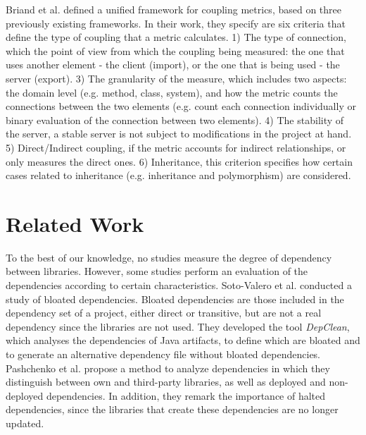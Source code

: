 \documentclass[a4paper]{article}
\begin{document}
Briand et al. \cite{briand1999unified} defined a unified framework for coupling metrics, based on three previously existing frameworks. In their work, they specify are six criteria that define the type of coupling that a metric calculates. 1) The type of connection, which the point of view from which the coupling being measured: the one that uses another element - the client (import), or the one that is being used - the server (export). 3) The granularity of the measure, which includes two aspects: the domain level (e.g. method, class, system), and how the metric counts the connections between the two elements (e.g. count each connection individually or binary evaluation of the connection between two elements). 4) The stability of the server, a stable server is not subject to modifications in the project at hand. 5) Direct/Indirect coupling, if the metric accounts for indirect relationships, or only measures the direct ones. 6) Inheritance, this criterion specifies how certain cases related to inheritance (e.g. inheritance and polymorphism) are considered.

\section{Related Work}
To the best of our knowledge, no studies measure the degree of dependency between libraries. However, some studies perform an evaluation of the dependencies according to certain characteristics.
Soto-Valero et al. \cite{soto2020comprehensive} conducted a study of bloated dependencies. Bloated dependencies are those included in the dependency set of a project, either direct or transitive, but are not a real dependency since the libraries are not used. They developed the tool \textit{DepClean}, which analyses the dependencies of Java artifacts, to define which are bloated and to generate an alternative dependency file without bloated dependencies.
Pashchenko et al. \cite{pashchenko2018vulnerable} propose a method to analyze dependencies in which they distinguish between own and third-party libraries, as well as deployed and non-deployed dependencies. In addition, they remark the importance of halted dependencies, since the libraries that create these dependencies are no longer updated.

\end{document}
